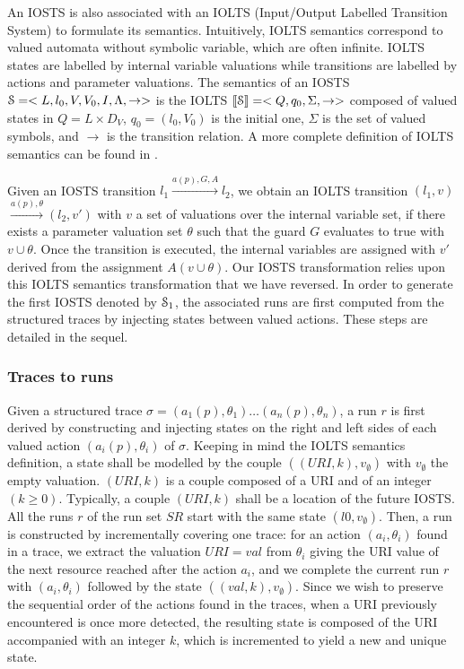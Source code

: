 An IOSTS is also associated with an IOLTS (Input/Output Labelled
Transition System) to formulate its semantics. Intuitively, IOLTS
semantics correspond to valued automata without symbolic
variable, which are often infinite. IOLTS states are labelled by
internal variable valuations while transitions are labelled by
actions and parameter valuations. The semantics of an IOSTS
$\EuScript{S}=<L,l_0,V,V_0,I,\Lambda,\rightarrow>$ is the IOLTS
$\llbracket \EuScript{S}\rrbracket = <Q,q_0,\Sigma,\rightarrow>$
composed of valued states in $Q = L \times D_V$, $q_0=(l_0,V_0)$
is the initial one, $\Sigma$ is the set of valued symbols, and
$\rightarrow$ is the transition relation. A more complete
definition of IOLTS semantics can be found in \cite{FTW05}.

Given an IOSTS transition $l_1 \xrightarrow{a(p),G,A}l_2$, we
obtain an IOLTS transition $(l_1,v)$ $\xrightarrow{a(p),\theta}
(l_2,v')$ with $v$ a set of valuations over the internal variable
set, if there exists a parameter valuation set $\theta$ such that
the guard $G$ evaluates to true with $v \cup \theta$. Once the
transition is executed, the internal variables are assigned with
$v'$ derived from the assignment $A(v \cup \theta)$.
Our IOSTS transformation relies upon this IOLTS semantics
transformation that we have reversed.  In order to generate the
first IOSTS denoted by $\EuScript{S}_1$, the associated runs are
first computed from the structured traces by injecting states
between valued actions. These steps are detailed in the
sequel.

\subsubsection{Traces to runs}

Given a structured trace $\sigma = (a_1(p),\theta_1) \dots
(a_n(p),\theta_n)$, a run $r$ is first derived by constructing
and injecting states on the right and left sides of
each valued action $(a_i(p),\theta_i)$ of $\sigma$. Keeping in
mind the IOLTS semantics definition, a state shall be modelled by
the couple $((URI,k),v_\emptyset)$ with $v_\emptyset$ the empty
valuation.  $(URI,k)$ is a couple composed of a URI and of an
integer $(k \geq 0)$. Typically, a couple $(URI,k)$ shall be a
location of the future IOSTS. All the runs $r$ of the run set
$SR$ start with the same state $(l0,v_\emptyset)$. Then, a run is
constructed by incrementally covering one trace: for an action
$(a_i,\theta_i)$ found in a trace, we extract the valuation
$URI=val$ from $\theta_i$ giving the URI value of the next
resource reached after the action $a_i$, and we complete the
current run $r$ with $(a_i,\theta_i)$ followed by the state
$((val,k),v_\emptyset)$.  Since we wish to preserve the
sequential order of the actions found in the traces, when a URI
previously encountered is once more detected, the resulting state
is composed of the URI accompanied with an integer $k$, which is
incremented to yield a new and unique state.

